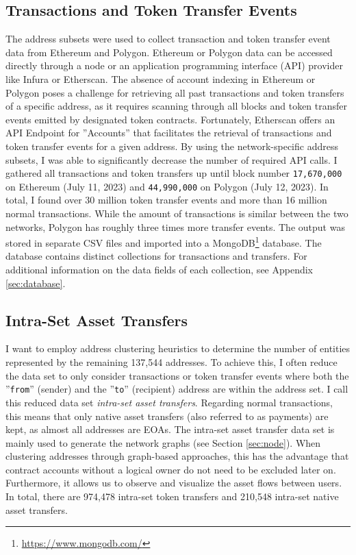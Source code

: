 \documentclass[12pt,a4paper,titlepage,oneside,english]{article}
\begin{document}
\subsection{Transactions and Token Transfer Events}
The address subsets were used to collect transaction and token transfer event data from Ethereum and Polygon. Ethereum or Polygon data can be accessed directly through a node or an application programming interface (API) provider like Infura or Etherscan. The absence of account indexing in Ethereum or Polygon poses a challenge for retrieving all past transactions and token transfers of a specific address, as it requires scanning through all blocks and token transfer events emitted by designated token contracts. Fortunately, Etherscan offers an API Endpoint for ''Accounts'' that facilitates the retrieval of transactions and token transfer events for a given address. By using the network-specific address subsets, I was able to significantly decrease the number of required API calls. 
I gathered all transactions and token transfers up until block number \texttt{17,670,000} on Ethereum (July 11, 2023) and \texttt{44,990,000} on Polygon (July 12, 2023). In total, I found over 30 million token transfer events and more than 16 million 
 normal transactions. While the amount of transactions is similar between the two networks, Polygon has roughly three times more transfer events. \newline The output was stored in separate CSV files and imported into a MongoDB\footnote{\url{https://www.mongodb.com/}} database. The database contains distinct collections for transactions and transfers. For additional information on the data fields of each collection, see Appendix \ref{sec:database}.  %

\subsection{Intra-Set Asset Transfers}
\label{sec:intra-set}
I want to employ address clustering heuristics to determine the number of entities represented by the remaining 137,544 addresses. %
To achieve this, I often reduce the data set to only consider transactions or token transfer events where both the ''\texttt{from}'' (sender) and the ''\texttt{to}'' (recipient) address are within the address set. I call this reduced data set \textit{intra-set asset transfers}. Regarding normal transactions, this means that only native asset transfers (also referred to as payments) are kept, as almost all addresses are EOAs. \newline
The intra-set asset transfer data set is mainly used to generate the network graphs (see Section \ref{sec:node}). 
When clustering addresses through graph-based approaches, this has the advantage that contract accounts without a logical owner do not need to be excluded later on. Furthermore, it allows us to observe and visualize the asset flows between users. In total, there are 974,478 intra-set token transfers and 210,548 intra-set native asset transfers.  %
\end{document}
